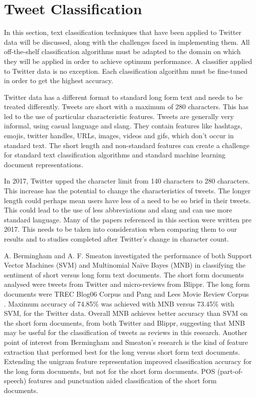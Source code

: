 \section{Tweet Classification}

In this section, text classification techniques that have been applied to Twitter data will be discussed, along with the challenges faced in implementing them. All off-the-shelf classification algorithms must be adapted to the domain on which they will be applied in order to achieve optimum performance. A classifier applied to Twitter data is no exception. Each classification algorithm must be fine-tuned in order to get the highest accuracy. 

Twitter data has a different format to standard long form text and needs to be treated differently. Tweets are short with a maximum of 280 characters. This has led to the use of particular characteristic features. Tweets are generally very informal, using casual language and slang. They contain features like hashtags, emojis, twitter handles, URLs, images, videos and gifs, which don't occur in standard text. The short length and non-standard features can create a challenge for standard text classification algorithms and standard machine learning document representations. 

In 2017, Twitter upped the character limit from 140 characters to 280 characters. This increase has the potential to change the characteristics of tweets. The longer length could perhaps mean users have less of a need to be so brief in their tweets. This could lead to the use of less abbreviations and slang and can use more standard language. Many of the papers referenced in this section were written pre 2017. This needs to be taken into consideration when comparing them to our results and to studies completed after Twitter's change in character count.

A. Bermingham and A. F. Smeaton \cite{Berm2010} investigated the performance of both Support Vector Machines (SVM) and Multinomial Naïve Bayes (MNB) in classifying the sentiment of short versus long form text documents. The short form documents analysed were tweets from Twitter and micro-reviews from Blippr. The long form documents were TREC Blog06 Corpus and Pang and Lees Movie Review Corpus \cite{panglee2004}. Maximum accuracy of 74.85\% was achieved with MNB versus 73.45\% with SVM, for the Twitter data. Overall MNB achieves better accuracy than SVM on the short form documents, from both Twitter and Blippr, suggesting that MNB may be useful for the classification of tweets as reviews in this research. Another point of interest from Bermingham and Smeaton's research is the kind of feature extraction that performed best for the long versus short form text documents. Extending the unigram feature representation improved classification accuracy for the long form documents, but not for the short form documents. POS (part-of-speech) features and punctuation aided classification of the short form documents.

